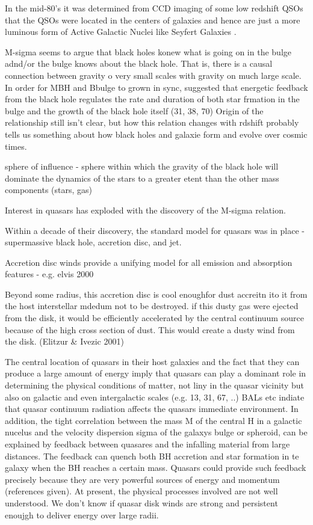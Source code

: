 In the mid-80's it was determined from CCD imaging of some low redshift QSOs that the QSOs were located in the centers of galaxies and hence are just a more luminous form of Active Galactic Nuclei like Seyfert Galaxies .

M-sigma seems to argue that black holes konew what is going on in the bulge adnd/or the bulge knows about the black hole. 
That is, there is a causal connection between gravity o very small scales with gravity on much large scale. 
In order for MBH and Bbulge to grown in sync, suggested that energetic feedback from the black hole regulates the rate and duration of both star frmation in the bulge and the growth of the black hole itself (31, 38, 70)
Origin of the relationship still isn't clear, but how this relation changes with rdshift probably tells us something about how black holes and galaxie form and evolve over cosmic times. 

sphere of influence - sphere within which the gravity of the black hole will dominate the dynamics of the stars to a greater etent than the other mass components (stars, gas)

Interest in quasars has exploded with the discovery of the M-sigma relation. 

Within a decade of their discovery, the standard model for quasars was in place  - supermassive black hole, accretion disc, and jet. 

Accretion disc winds provide a unifying model for all emission and absorption features - e.g. elvis 2000

Beyond some radius, this accretion disc is cool enoughfor dust accreitn ito it from the host interstellar mdedum not to be destroyed. if this dusty gas were ejected from the disk, it would be efficiently accelerated by the central continuum source because of the high cross section of dust. This would create a dusty wind from the disk. 
(Elitzur \& Ivezic 2001)

The central location of quasars in their host galaxies and the fact that they can produce a large amount of energy imply that quasars can play a dominant role in determining the physical conditions of matter, not liny in the quasar vicinity but also on galactic and even intergalactic scales (e.g. 13, 31, 67, ..) 
BALs etc indiate that quasar continuum radiation affects the quasars immediate environment.  In addition, the tight correlation between the mass M of the central H in a galactic nucelus and the velocity dispersion sigma of the galaxys bulge or spheroid, can be explained by feedback between quasares and the infalling material from large distances.  The feedback can quench both BH accretion and star formation in te galaxy when the BH reaches a certain mass. Quasars could provide such feedback precisely because they are very powerful sources of energy and momentum (references given). At present, the physical processes involved are not well understood. We don't know if quasar disk winds are strong and persistent enoujgh to deliver energy over large radii. 

